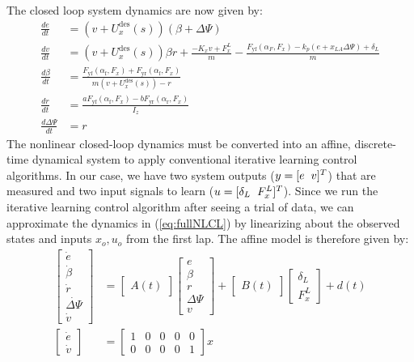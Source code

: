 The closed loop system dynamics are now given by: 
\begin{align}
\label{eq:fullNLCL}	
	\frac{de}{dt} &= \left(v+U^\mathrm{des}_x(s)\right)(\beta + \Delta\Psi) \\
	\frac{dv}{dt} &= \left(v+U^\mathrm{des}_x(s)\right)\beta r + \frac{-K_xv + F^L_x}{m} - \frac{F_\mathrm{yf}(\alpha_F,F_x)-k_p(e + x_{LA}\Delta\Psi) + \delta_L}{m}\\
	\frac{d\beta}{dt} &= \frac{F_\mathrm{yf}(\alpha_\mathrm{f}, F_x) + F_\mathrm{yr}(\alpha_\mathrm{f},F_x)}{m\left(v + U^\mathrm{des}_x(s)\right) - r} \\
	\frac{dr}{dt}     &= \frac{aF_\mathrm{yf}(\alpha_\mathrm{f}, F_x) - bF_\mathrm{yr}(\alpha_\mathrm{r}, F_x)}{I_z} \\
	\frac{d\Delta\Psi}{dt} &= r
\end{align}
The nonlinear closed-loop dynamics must be converted into an affine, discrete-time dynamical system to apply conventional iterative learning
control algorithms. In our case, we have two system outputs ($y = [e \hspace{2mm} v]^T$) that are measured and two input signals to learn ($u = [\delta_L \hspace{2mm} F^L_x]^T$). 
Since we run the iterative learning control algorithm after seeing a trial of data, we can approximate
the dynamics in (\ref{eq:fullNLCL}) by linearizing about the observed states and inputs $x_o, u_o$ from the first lap. The affine model is therefore given by: 
 \begin{align}
 \label{eq:ssMAT}
 \begin{bmatrix} \dot{e} \\ \dot{\beta} \\ \dot{r} \\ \dot{\Delta\Psi} \\ \dot{v}\end{bmatrix} &= \begin{bmatrix} A(t) \end{bmatrix} \begin{bmatrix} e \\ \beta \\ r \\ \Delta\Psi \\ v \end{bmatrix} + \begin{bmatrix} B(t) \end{bmatrix} \begin{bmatrix} \delta_L \\ F^L_x \end{bmatrix} + d(t) \\
 \begin{bmatrix} \dot{e} \\ \dot{v} \end{bmatrix}  &= \begin{bmatrix} 1 & 0 & 0 & 0 & 0 \\ 0 & 0 & 0 & 0 & 1 \end{bmatrix} x
 \end{align}
 
